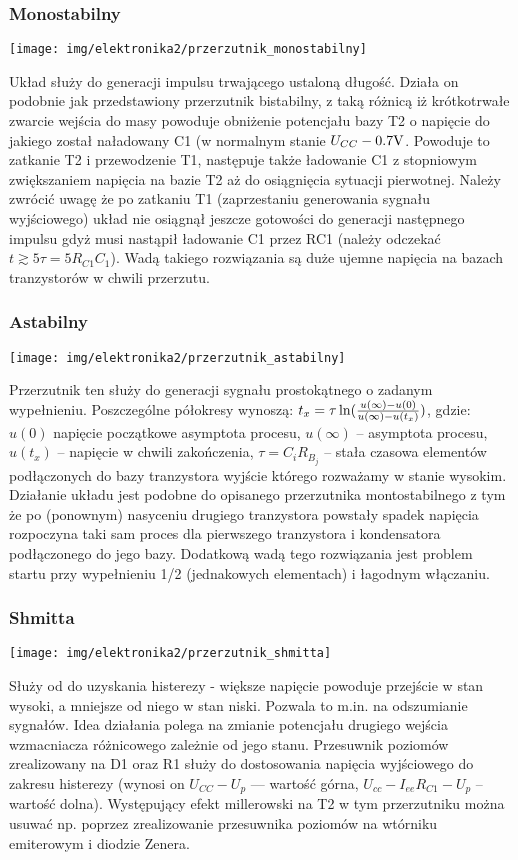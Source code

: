 \documentclass{pdfBooklets}
\begin{document}
\subsubsection{Monostabilny}
\begin{center}\texttt{[image: img/elektronika2/przerzutnik\_monostabilny]}\end{center}
Układ służy do generacji impulsu trwającego ustaloną długość.
Działa on podobnie jak przedstawiony przerzutnik bistabilny, z taką różnicą iż krótkotrwałe zwarcie wejścia do masy powoduje obniżenie potencjału bazy T2 o napięcie do jakiego został naładowany C1 (w normalnym stanie $U_{CC}-0.7\rm{V}$.
Powoduje to zatkanie T2 i przewodzenie T1, następuje także ładowanie C1 z stopniowym zwiększaniem napięcia na bazie T2 aż do osiągnięcia sytuacji pierwotnej.
Należy zwrócić uwagę że po zatkaniu T1 (zaprzestaniu generowania sygnału wyjściowego) układ nie osiągnął jeszcze gotowości do generacji następnego impulsu gdyż musi nastąpił ładowanie C1 przez RC1 (należy odczekać $t \gtrsim  5 \tau = 5 R_{C1} C_1$).
Wadą takiego rozwiązania są duże ujemne napięcia na bazach tranzystorów w chwili przerzutu.

\subsubsection{Astabilny}
\begin{center}\texttt{[image: img/elektronika2/przerzutnik\_astabilny]}\end{center}
Przerzutnik ten służy do generacji sygnału prostokątnego o zadanym wypełnieniu.
Poszczególne półokresy wynoszą: $t_x = \tau \ln({u(\infty) - u(0) \over u(\infty) - u(t_x)})$, gdzie:
$u(0)$  napięcie początkowe asymptota procesu,
$u(\infty)$ – asymptota procesu,
$u(t_x)$ – napięcie w chwili zakończenia,
$\tau = C_i R_{B_j}$ – stała czasowa elementów podłączonych do bazy tranzystora wyjście którego rozważamy w stanie wysokim.
Działanie układu jest podobne do opisanego przerzutnika montostabilnego z tym że po (ponownym) nasyceniu drugiego tranzystora powstały spadek napięcia rozpoczyna taki sam proces dla pierwszego tranzystora i kondensatora  podłączonego do jego bazy.
Dodatkową wadą tego rozwiązania jest problem startu przy wypełnieniu 1/2 (jednakowych elementach) i łagodnym włączaniu.

\subsubsection{Shmitta}
\begin{center}\texttt{[image: img/elektronika2/przerzutnik\_shmitta]}\end{center}
Służy od do uzyskania histerezy - większe napięcie powoduje przejście w stan wysoki, a mniejsze od niego w stan niski.
Pozwala to m.in. na odszumianie sygnałów.
Idea działania polega na zmianie potencjału drugiego wejścia wzmacniacza różnicowego zależnie od jego stanu.
Przesuwnik poziomów zrealizowany na D1 oraz R1 służy do dostosowania napięcia wyjściowego do zakresu histerezy (wynosi on $U_{CC}-U_p$ --- wartość górna, $U_{cc} - I_{ee} R_{C1} - U_p$ -- wartość dolna).
Występujący efekt millerowski na T2 w tym przerzutniku można usuwać np. poprzez zrealizowanie przesuwnika poziomów na wtórniku emiterowym i diodzie Zenera.
\end{document}

